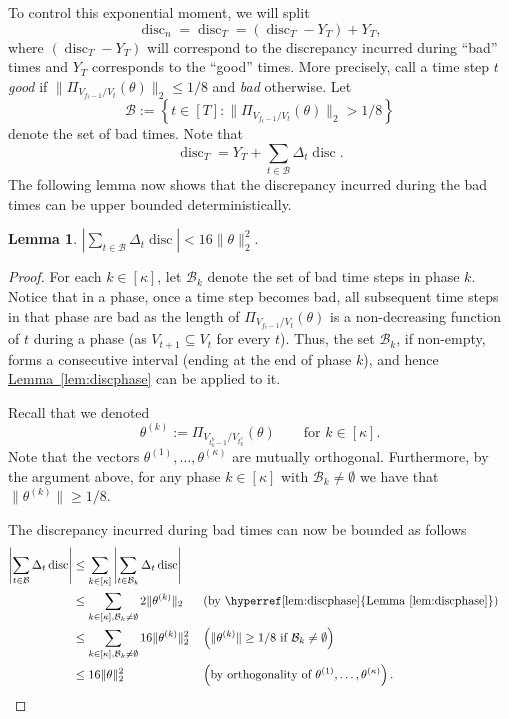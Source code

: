 \documentclass[11pt]{article}
\numberwithin{equation}{section}
\newtheorem{lemma}[theorem]{Lemma}
\theoremstyle{definition}
\theoremstyle{plain}
\newcommand{\expref}[2]{\hyperref[#2]{#1~\ref{#2}}}
\DeclareMathOperator{\disc}{disc}   %
\newcommand{\set}[1]{\left\{ #1 \right\}}
\begin{document}
To control this exponential moment, we will split
\[
  \disc_n=\disc_T = (\disc_T-Y_T) +
  Y_T,
\]
where $(\disc_T-Y_T)$ will correspond to the discrepancy incurred
during ``bad'' times and $Y_T$ corresponds to the ``good'' times. More
precisely, call a time step $t$ \textit{good} if
$\| \Pi_{V_{f_t-1}/V_{t}} (\theta) \|_2 \le 1/8$ and \textit{bad}
otherwise. Let
\[
\mathcal{B} := \set{t \in [T]: \|\Pi_{V_{f_t-1}/V_t}(\theta)\|_2 > 1/8}
\]
denote the set of bad times. Note that
\[
\disc_T = Y_T+ \sum_{t \in \mathcal{B}} \Delta_t \disc.
\]
The following lemma now shows that the discrepancy incurred during the bad times
can be upper bounded deterministically.

\begin{lemma} $
\left|\sum_{t \in \mathcal{B}} \Delta_t \disc\right| < 16 \|\theta\|_2^2.
$
\label{lem:l1}
\end{lemma}
\begin{proof}
For each $k \in [\kappa]$, let $\mathcal{B}_k$ denote the set of bad time steps in phase $k$. Notice that in a phase, once a time step becomes bad, all subsequent time steps in that phase are bad as the length of
$\Pi_{V_{f_t-1}/V_{t}} (\theta)$ is a non-decreasing function of $t$ during a
phase (as $V_{t+1} \subseteq V_{t}$ for every $t$).  Thus, the set $\mathcal{B}_k$, if non-empty, forms a consecutive interval (ending at the end of phase $k$), and hence
\expref{Lemma}{lem:discphase} can be applied to it.

Recall that we denoted
\[
\theta^{(k)}:=\Pi_{V_{t^b_k-1}/V_{t^e_k}} (\theta)\qquad\text{for $k \in [\kappa]$}.
\]
Note that the vectors $\theta^{(1)},\dots,\theta^{(\kappa)}$ are
mutually orthogonal. Furthermore, by the argument above, for any phase
%
$k \in [\kappa]$ with $\mathcal{B}_k\neq \emptyset$ we have that
$\|\theta^{(k)}\| \geq 1/8$.

The discrepancy incurred during bad times can now be bounded as follows
\begin{align*}
\left|\sum_{t \in \mathcal{B}} \Delta_t \disc\right|
&\leq \sum_{k \in [\kappa]} \left|\sum_{t \in \mathcal{B}_k} \Delta_t \disc\right| \\
&\leq \sum_{k \in [\kappa], \mathcal{B}_k\neq \emptyset} 2 \|\theta^{(k)}\|_2
&& \left(\text{by \expref{Lemma}{lem:discphase}} \right) \\
& \leq  \sum_{k \in  [\kappa], \mathcal{B}_k\neq \emptyset} 16 \|\theta^{(k)}\|^2_2 && \left(\|\theta^{(k)}\| \geq 1/8 \text{ if } \mathcal{B}_k\neq \emptyset  \right) \\
&\leq 16 \|\theta\|^2_2 && \left(\text{by orthogonality
of } \theta^{(1)},\dots,\theta^{(\kappa)} \right). \qedhere
\end{align*}
\end{proof}
\end{document}
